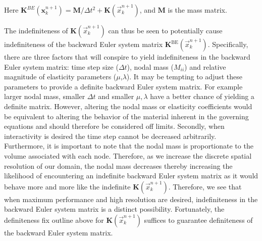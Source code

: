 Here $\mathbf{K}^{BE}(\mathbf{x}^{n+1}_k) = \mathbf{M}/\Delta{t}^2+\mathbf{K}(\vec{x}^{n+1}_{k})$, and $\mathbf{M}$ is the mass matrix. 

The indefiniteness of $\mathbf{K}(\vec{x}^{n+1}_{k})$ can thus be seen to potentially cause indefiniteness of the backward Euler system matrix $\mathbf{K}^\textrm{BE}(\vec{x}^{n+1}_{k})$. Specifically, there are three factors that will conspire to yield indefiniteness in the  backward Euler system matrix: time step size ($\Delta{t}$), nodal mass ($M_{ii}$) and relative magnitude of elasticity parameters ($\mu$,$\lambda$). It may be tempting to adjust these parameters to provide a definite backward Euler system matrix. For example larger nodal mass, smaller $\Delta{t}$ and smaller $\mu,\lambda$ have a better chance of yielding a definite matrix. However, altering the nodal mass or elasticity coefficients would be equivalent to altering the behavior of the material inherent in the governing equations and should therefore be considered off limits. Secondly, when interactivity is desired the time step cannot be decreased arbitrarily. Furthermore, it is important to note that the nodal mass is proportionate to the volume associated with each node. Therefore, as we increase the discrete spatial resolution of our domain, the nodal mass decreases thereby increasing the likelihood of encountering an indefinite backward Euler system matrix as it would behave more and more like the indefinite $\mathbf{K}(\vec{x}^{n+1}_{k})$. Therefore, we see that when maximum performance and high resolution are desired, indefiniteness in the backward Euler system matrix is a distinct possibility. Fortunately, the definiteness fix outline above for $\mathbf{K}(\vec{x}^{n+1}_{k})$ suffices to guarantee definiteness of the backward Euler system matrix.
